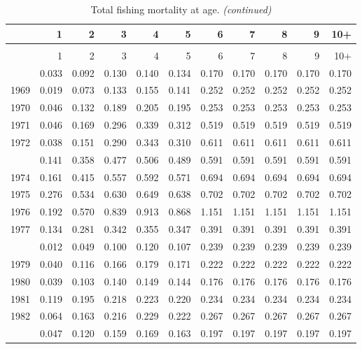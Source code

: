 \documentclass[
]{article}
\begin{document}
\begin{longtable}[t]{lrrrrrrrrrr}
\caption{\label{tab:FAA-tot-table}Total fishing mortality at age.}\\
\toprule
  & 1 & 2 & 3 & 4 & 5 & 6 & 7 & 8 & 9 & 10+\\
\midrule
\endfirsthead
\caption[]{Total fishing mortality at age. \textit{(continued)}}\\
\toprule
  & 1 & 2 & 3 & 4 & 5 & 6 & 7 & 8 & 9 & 10+\\
\midrule
\endhead

\endfoot
\bottomrule
\endlastfoot
1968 & 0.033 & 0.092 & 0.130 & 0.140 & 0.134 & 0.170 & 0.170 & 0.170 & 0.170 & 0.170\\
1969 & 0.019 & 0.073 & 0.133 & 0.155 & 0.141 & 0.252 & 0.252 & 0.252 & 0.252 & 0.252\\
1970 & 0.046 & 0.132 & 0.189 & 0.205 & 0.195 & 0.253 & 0.253 & 0.253 & 0.253 & 0.253\\
1971 & 0.046 & 0.169 & 0.296 & 0.339 & 0.312 & 0.519 & 0.519 & 0.519 & 0.519 & 0.519\\
1972 & 0.038 & 0.151 & 0.290 & 0.343 & 0.310 & 0.611 & 0.611 & 0.611 & 0.611 & 0.611\\
\addlinespace
1973 & 0.141 & 0.358 & 0.477 & 0.506 & 0.489 & 0.591 & 0.591 & 0.591 & 0.591 & 0.591\\
1974 & 0.161 & 0.415 & 0.557 & 0.592 & 0.571 & 0.694 & 0.694 & 0.694 & 0.694 & 0.694\\
1975 & 0.276 & 0.534 & 0.630 & 0.649 & 0.638 & 0.702 & 0.702 & 0.702 & 0.702 & 0.702\\
1976 & 0.192 & 0.570 & 0.839 & 0.913 & 0.868 & 1.151 & 1.151 & 1.151 & 1.151 & 1.151\\
1977 & 0.134 & 0.281 & 0.342 & 0.355 & 0.347 & 0.391 & 0.391 & 0.391 & 0.391 & 0.391\\
\addlinespace
1978 & 0.012 & 0.049 & 0.100 & 0.120 & 0.107 & 0.239 & 0.239 & 0.239 & 0.239 & 0.239\\
1979 & 0.040 & 0.116 & 0.166 & 0.179 & 0.171 & 0.222 & 0.222 & 0.222 & 0.222 & 0.222\\
1980 & 0.039 & 0.103 & 0.140 & 0.149 & 0.144 & 0.176 & 0.176 & 0.176 & 0.176 & 0.176\\
1981 & 0.119 & 0.195 & 0.218 & 0.223 & 0.220 & 0.234 & 0.234 & 0.234 & 0.234 & 0.234\\
1982 & 0.064 & 0.163 & 0.216 & 0.229 & 0.222 & 0.267 & 0.267 & 0.267 & 0.267 & 0.267\\
\addlinespace
1983 & 0.047 & 0.120 & 0.159 & 0.169 & 0.163 & 0.197 & 0.197 & 0.197 & 0.197 & 0.197\\

\end{longtable}
\end{document}
